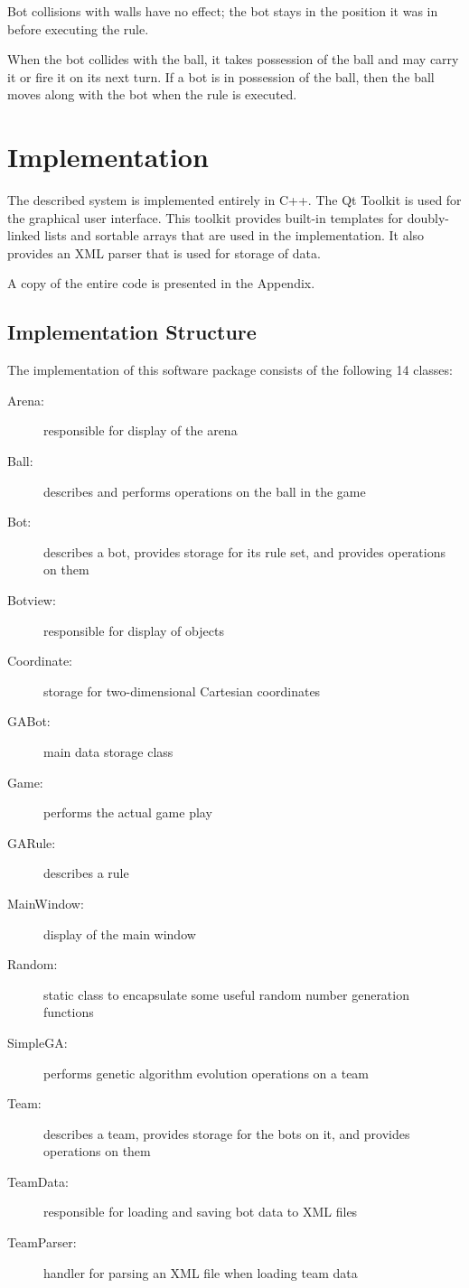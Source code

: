 \documentclass[%
        compressed,
        notitlepage,
        narroweqnarray,
        inline,
        ]{ieee}
\begin{document}
Bot collisions with walls have no effect; the bot stays in the position it
was in before executing the rule.

When the bot collides with the ball, it takes possession of the ball and may
carry it or fire it on its next turn. If a bot is in possession of the ball, then
the ball moves along with the bot when the rule is executed.

\section{Implementation}

The described system is implemented entirely in C++. The Qt Toolkit is used
for the graphical user interface. This toolkit provides built-in templates
for doubly-linked lists and sortable arrays that are used in the
implementation. It also provides an XML parser that is used for storage of
data.

A copy of the entire code is presented in the Appendix.

\subsection{Implementation Structure}

The implementation of this software package consists of the
following 14 classes:
\nopagebreak
\begin{description}
\item [Arena:] responsible for display of the arena
\item [Ball:] describes and performs operations on the ball in the game
\item [Bot:] describes a bot, provides storage for its rule set, and
provides operations on them
\item [Botview:] responsible for display of objects
\item [Coordinate:] storage for two-dimensional Cartesian coordinates
\item [GABot:] main data storage class
\item [Game:] performs the actual game play
\item [GARule:] describes a rule
\item [MainWindow:] display of the main window
\item [Random:] static class to encapsulate some useful random number
generation functions
\item [SimpleGA:] performs genetic algorithm evolution operations on a team
\item [Team:] describes a team, provides storage for the bots on it, and
provides operations on them
\item [TeamData:] responsible for loading and saving bot data to XML files
\item [TeamParser:] handler for parsing an XML file when loading team data
\end{description}
\end{document}
